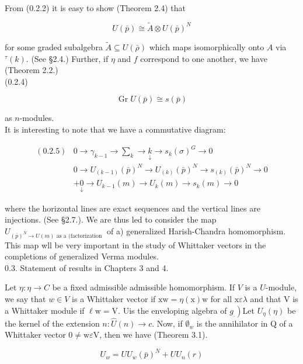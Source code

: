 \documentclass[10pt]{article}
\begin{document}
From (0.2.2) it is easy to show (Theorem 2.4) that


\begin{equation*}
U(\bar{p}) \cong \tilde{A} \otimes U(\bar{p})^{N} \tag{0.2.3}
\end{equation*}


for some graded subalgebra $\tilde{A} \subseteq U(\bar{\rho})$ which maps isomorphically onto $A$ via ${ }^{\tau}(k)$. (See §2.4.) Further, if $\eta$ and $f$ correspond to one another, we have (Theorem 2.2.)\\
(0.2.4)

$$
\operatorname{Gr} U(\bar{p}) \cong s(\bar{p})
$$

as $n$-modules.\\
It is interesting to note that we have a commutative diagram:

$$
\begin{aligned}
(0.2 .5) & 0 \rightarrow \gamma_{k-1} \rightarrow \sum_{k} \rightarrow \underset{\downarrow}{k} \rightarrow s_{k}(\sigma)^{G} \rightarrow 0 \\
& 0 \rightarrow U_{(k-1)}(\bar{p})^{N} \rightarrow U_{(k)}(\bar{p})^{N} \rightarrow s_{(k)}(\bar{p})^{N} \rightarrow 0 \\
& +\underset{\downarrow}{0} \rightarrow U_{k-1}(m) \rightarrow U_{k}(m) \rightarrow s_{k}(m) \rightarrow 0
\end{aligned}
$$

where the horizontal lines are exact sequences and the vertical lines are injections. (See §2.7.). We are thus led to consider the map $U_{(\bar{p})^{N} \rightarrow U(m) \text { as a (factorization }}$ of a) generalized Harish-Chandra homomorphism. This map wll be very important in the study of Whittaker vectors in the completions of generalized Verma modules.\\
0.3. Statement of results in Chapters 3 and 4.

Let $\eta: \eta \rightarrow C$ be a fixed admissible admissible homomorphism. If $V$ is a $U$-module, we say that $w \in V$ is a Whittaker vector if $\mathrm{xw}=\eta(\mathrm{x}) \mathrm{w}$ for all $\mathrm{x} \varepsilon \lambda$ and that V is a Whittaker module if $\ell \mathrm{w}=\mathrm{V}$. Uis the enveloping algebra of $\left.g_{.}\right)$Let $U_{\eta}(\eta)$ be the kernel of the extension $n: \hat{U}(n) \rightarrow c$. Now, if $\emptyset_{w}$ is the annihilator in Q of a Whittaker vector $0 \neq \mathrm{w} \varepsilon \mathrm{V}$, then we have (Theorem 3.1).


\begin{equation*}
U_{w}=U U_{w}(\bar{p})^{N}+U U_{n}(r) \tag{0.3.1}
\end{equation*}
\end{document}
